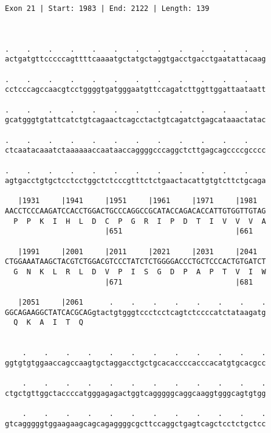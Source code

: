 \documentclass{article}
\begin{document}
\begin{Verbatim}
Exon 21 | Start: 1983 | End: 2122 | Length: 139



.    .    .    .    .    .    .    .    .    .    .    .    
actgatgttcccccagttttcaaaatgctatgctaggtgacctgacctgaatattacaag
                                                            
.    .    .    .    .    .    .    .    .    .    .    .    
cctcccagccaacgtcctggggtgatgggaatgttccagatcttggttggattaataatt
                                                            
.    .    .    .    .    .    .    .    .    .    .    .    
gcatgggtgtattcatctgtcagaactcagcctactgtcagatctgagcataaactatac
                                                            
.    .    .    .    .    .    .    .    .    .    .    .    
ctcaatacaaatctaaaaaaccaataaccaggggcccaggctcttgagcagccccgcccc
                                                            
.    .    .    .    .    .    .    .    .    .    .    .    
agtgacctgtgctcctcctggctctcccgtttctctgaactacattgtgtcttctgcaga
                                                            
   |1931     |1941     |1951     |1961     |1971     |1981  
AACCTCCCAAGATCCACCTGGACTGCCCAGGCCGCATACCAGACACCATTGTGGTTGTAG
  P  P  K  I  H  L  D  C  P  G  R  I  P  D  T  I  V  V  V  A
                       |651                          |661   
  
   |1991     |2001     |2011     |2021     |2031     |2041  
CTGGAAATAAGCTACGTCTGGACGTCCCTATCTCTGGGGACCCTGCTCCCACTGTGATCT
  G  N  K  L  R  L  D  V  P  I  S  G  D  P  A  P  T  V  I  W
                       |671                          |681   
  
   |2051     |2061      .    .    .    .    .    .    .    .
GGCAGAAGGCTATCACGCAGgtactgtgggtccctcctcagtctccccatctataagatg
  Q  K  A  I  T  Q                                          
                                                            
  
    .    .    .    .    .    .    .    .    .    .    .    .
ggtgtgtggaaccagccaagtgctaggacctgctgcacaccccacccacatgtgcacgcc
                                                            
    .    .    .    .    .    .    .    .    .    .    .    .
ctgctgttggctaccccatgggagagactggtcagggggcaggcaaggtgggcagtgtgg
                                                            
    .    .    .    .    .    .    .    .    .    .    .    .
gtcagggggtggaagaagcagcagaggggcgcttccaggctgagtcagctcctctgctcc
                                                            

\end{Verbatim}
\end{document}
